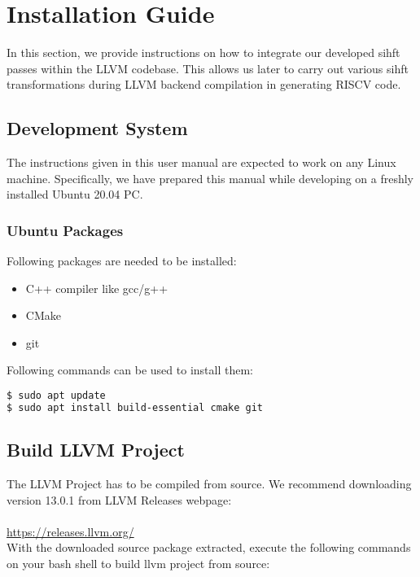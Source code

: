 

\section{Installation Guide}
\label{sec:Install}

In this section, we provide instructions on how to integrate our developed \ac{sihft} passes within the LLVM codebase.
This allows us later to carry out various \ac{sihft} transformations during LLVM backend compilation in generating
RISCV code.

\subsection{Development System}
The instructions given in this user manual are expected to work on any Linux machine. Specifically, we have prepared
this manual while developing on a freshly installed Ubuntu 20.04 PC.

\subsubsection{Ubuntu Packages}
Following packages are needed to be installed:

\begin{itemize}
 \item{C++ compiler like gcc/g++}
 \item{CMake}
 \item{git}
\end{itemize}

Following commands can be used to install them:

\begin{lstlisting}[language=bash, frame=single, basicstyle=\small\ttfamily]
$ sudo apt update
$ sudo apt install build-essential cmake git
  \end{lstlisting}

\subsection{Build LLVM Project}
\label{sec:build-llvm}
The LLVM Project has to be compiled from source. We recommend downloading version 13.0.1 from LLVM Releases webpage:
\\\\
\url{https://releases.llvm.org/} \\

With the downloaded source package extracted, execute the following commands on your bash shell to build
llvm project from source:


